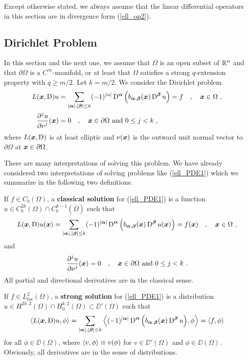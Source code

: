 Except otherwise stated, we always assume that the linear differential
operators in this section are in divergence form (\ref{ell_op2}).

\subsection{Dirichlet Problem}

In this section and the next one, we assume that $\Omega$ is an open
subset of $\displaystyle \mathbb{R}^n$ and that $\partial \Omega$ is a
$\displaystyle C^\infty$-manifold, or at least that $\Omega$ satisfies
a strong $q$-extension property with $q\geq m/2$.  Let $k = m/2$.
We consider the Dirichlet problem
\begin{equation} \label{ell_PDE1}
\begin{split}
L({\bm{x}}, \operatorname{D})u &= \sum_{|{\bm{\alpha}}|,|{\bm{\beta}}|\leq k}
(-1)^{|\alpha|} \operatorname{D}^{{\bm{\alpha}}}
\left( b_{{\bm{\alpha}},{\bm{\beta}}}({\bm{x}}) \operatorname{D}^{{\bm{\beta}}} u\right)
= f \quad , \quad
{\bm{x}} \in \Omega \ ,\\
\frac{\displaystyle \partial^{j}{u}} {\displaystyle \partial \nu^{j}}({\bm{x}}) &= 0 \quad , \quad
{\bm{x}} \in \partial \Omega \ \text{and}\  0 \leq j < k \ ,
\end{split}
\end{equation}
where $L({\bm{x}}, \operatorname{D})$ is at least elliptic and $\nu({\bm{x}})$ is
the outward unit normal vector to $\partial \Omega$ at
${\bm{x}} \in \partial \Omega$.

There are many interpretations of solving this problem.  We have already
considered two interpretations of solving problems like (\ref{ell_PDE1})
which we summarize in the following two definitions.

\begin{defn}
If $f \in C_b(\Omega)$, a {\bfseries classical solution}
for (\ref{ell_PDE1}) is a function
$\displaystyle u \in C^{2k}_b(\Omega) \cap C^{k-1}_b(\overline{\Omega})$
such that
\[
L(\VEC{x},\diff)u(\VEC{x}) = \sum_{|\VEC{\alpha}|,|\VEC{\beta}|\leq k}
(-1)^{|\VEC{\alpha}|} \diff^{\VEC{\alpha}}
\left( b_{\VEC{\alpha},\VEC{\beta}}(\VEC{x}) \diff^{\VEC{\beta}}
u(\VEC{x}) \right) = f(\VEC{x}) \quad , \quad \VEC{x} \in \Omega \ ,
\]
and
\[
\frac{\displaystyle \partial^{j}{u}} {\displaystyle \partial \nu^{j}}({\bm{x}}) = 0 \quad , \quad
{\bm{x}} \in \partial \Omega \ \text{and}\ 0 \leq j < k \ .
\]
All partial and directional derivatives are in the classical sense.
\end{defn}

\begin{defn}
If $\displaystyle f\in L_{loc}^2(\Omega)$, a {\bfseries strong solution}
for (\ref{ell_PDE1}) is a distribution
$\displaystyle u \in H^{2k,2}(\Omega) \cap H^{k,2}_0(\Omega) \subset
\DD'(\Omega)$ such that
\[
\left\langle{ L({\bm{x}},\operatorname{D})u} , {\phi}\right\rangle =
\sum_{|{\bm{\alpha}}|,|{\bm{\beta}}|\leq k} \left\langle{ (-1)^{|{\bm{\alpha}}|}
\operatorname{D}^{{\bm{\alpha}}} \left( b_{{\bm{\alpha}},{\bm{\beta}}}({\bm{x}})
\operatorname{D}^{{\bm{\beta}}} u \right) } , {\phi}\right\rangle = \left\langle{f} , {\phi}\right\rangle
\]
for all $\displaystyle \phi \in \DD(\Omega)$,
where $\left\langle{v} , {\phi}\right\rangle \equiv v(\phi)$ for $v\in \DD'(\Omega)$ and
$\phi \in \DD(\Omega)$.  Obviously, all derivatives are in the sense
of distributions.
\end{defn}

